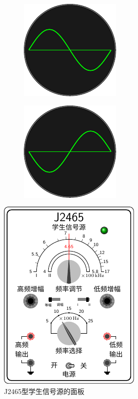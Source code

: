 \begin{figure}[htbp]
    \centering
    \begin{subfigure}{0.4\linewidth}
        \centering
        \includegraphics{fig/C/10-2a.pdf}
        \caption{}\label{fig_C_10-2a}
    \end{subfigure}
    \hfil
    \begin{subfigure}{0.4\linewidth}
        \centering
        \includegraphics{fig/C/10-2b.pdf}
        \caption{}\label{fig_C_10-2b}
    \end{subfigure}
    \caption{}\label{fig_C_10-2}
\end{figure}

\begin{figure}[htbp]
    \centering
    \includegraphics{fig/C/10-3.pdf}
    \caption{J2465型学生信号源的面板}\label{fig_C_10-3}
\end{figure}

